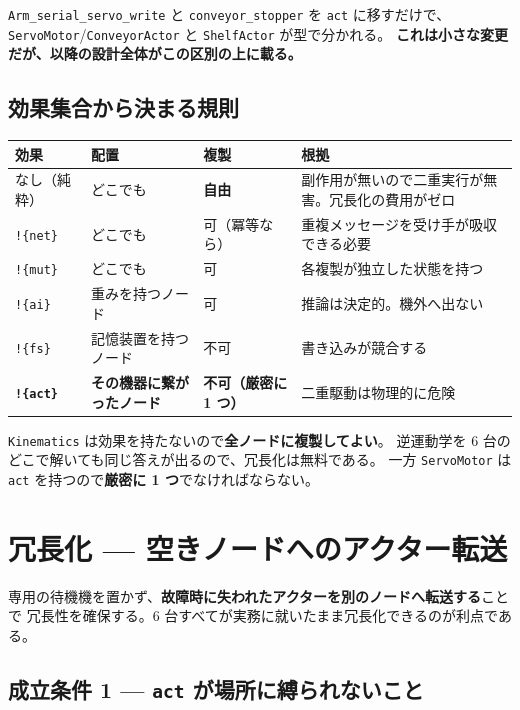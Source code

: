 \documentclass[11pt,a4paper]{article}
\newcommand{\code}[1]{\texttt{#1}}
\newcommand{\prob}[1]{\textbf{\textcolor{red!55!black}{#1}}}
\newcommand{\good}[1]{\textbf{\textcolor{green!45!black}{#1}}}
\begin{document}
\code{Arm\_serial\_servo\_write} と \code{conveyor\_stopper} を \code{act} に移すだけで、
\code{ServoMotor}/\code{ConveyorActor} と \code{ShelfActor} が型で分かれる。
\textbf{これは小さな変更だが、以降の設計全体がこの区別の上に載る。}

\subsection{効果集合から決まる規則}\label{sec:rules}

\begin{center}\small
\begin{tabularx}{\textwidth}{@{}l l l X@{}}
\toprule
\textbf{効果} & \textbf{配置} & \textbf{複製} & \textbf{根拠}\\
\midrule
なし（純粋） & どこでも & \good{自由} & 副作用が無いので二重実行が無害。冗長化の費用がゼロ\\
\code{!\{net\}} & どこでも & 可（冪等なら） & 重複メッセージを受け手が吸収できる必要\\
\code{!\{mut\}} & どこでも & 可 & 各複製が独立した状態を持つ\\
\code{!\{ai\}} & 重みを持つノード & 可 & 推論は決定的。機外へ出ない\\
\code{!\{fs\}} & 記憶装置を持つノード & 不可 & 書き込みが競合する\\
\good{\code{!\{act\}}} & \textbf{その機器に繋がったノード} & \prob{不可（厳密に 1 つ）} & 二重駆動は物理的に危険\\
\bottomrule
\end{tabularx}
\end{center}

\code{Kinematics} は効果を持たないので\textbf{全ノードに複製してよい}。
逆運動学を 6 台のどこで解いても同じ答えが出るので、冗長化は無料である。
一方 \code{ServoMotor} は \code{act} を持つので\textbf{厳密に 1 つ}でなければならない。

\section{冗長化 --- 空きノードへのアクター転送}

専用の待機機を置かず、\textbf{故障時に失われたアクターを別のノードへ転送する}ことで
冗長性を確保する。6 台すべてが実務に就いたまま冗長化できるのが利点である。

\subsection{成立条件 1 --- \code{act} が場所に縛られないこと}
\end{document}
